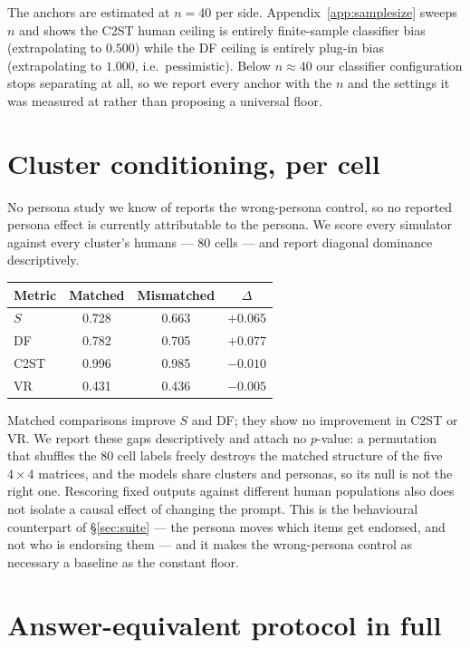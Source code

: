 \documentclass[11pt]{article}
\begin{document}
The anchors are estimated at $n{=}40$ per side. Appendix~\ref{app:samplesize}
sweeps $n$ and shows the C2ST human ceiling is entirely finite-sample classifier
bias (extrapolating to $0.500$) while the DF ceiling is entirely plug-in bias
(extrapolating to $1.000$, i.e.\ pessimistic). Below $n\approx40$ our classifier
configuration stops separating at all, so we report every anchor with the $n$ and
the settings it was measured at rather than proposing a universal floor.


\section{Cluster conditioning, per cell}
\label{app:permutation}


No persona study we know of reports the wrong-persona control, so no reported
persona effect is currently attributable to the persona. We score every simulator
against every cluster's humans --- 80 cells --- and report diagonal dominance
descriptively.

\begin{center}\footnotesize
\setlength{\tabcolsep}{5pt}
\begin{tabular}{lccc}
\toprule
Metric & Matched & Mismatched & $\Delta$\\
\midrule
$S$ & 0.728 & 0.663 & $+0.065$\\
DF & 0.782 & 0.705 & $+0.077$\\
C2ST & 0.996 & 0.985 & $-0.010$\\
VR & 0.431 & 0.436 & $-0.005$\\
\bottomrule
\end{tabular}
\end{center}

Matched comparisons improve $S$ and DF; they show no improvement in C2ST or VR.
We report these gaps descriptively and attach no $p$-value: a permutation that
shuffles the 80 cell labels freely destroys the matched structure of the five
$4\times4$ matrices, and the models share clusters and personas, so its null is
not the right one. Rescoring fixed outputs against different human populations
also does not isolate a causal effect of changing the prompt. This is the behavioural counterpart of
\S\ref{sec:suite} --- the persona moves which items get endorsed, and not who is
endorsing them --- and it makes the wrong-persona control as necessary a baseline
as the constant floor.


\section{Answer-equivalent protocol in full}
\label{app:protocol}
\end{document}
